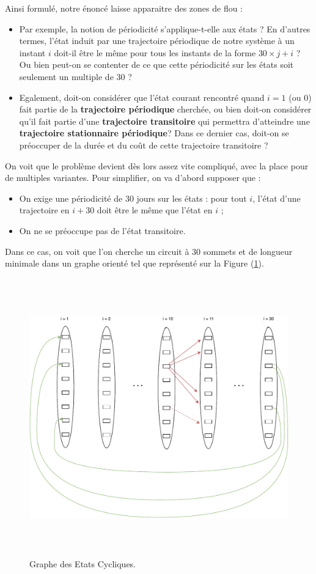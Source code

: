 Ainsi formulé, notre énoncé laisse apparaitre des zones de flou : 
\begin{itemize}[label=$\square$]
	\item	Par exemple, la notion de périodicité s'applique-t-elle aux états ? En d'autres termes, l'état induit par une trajectoire périodique de notre système à un instant $i$ doit-il être le même pour tous les instants de la forme $30 \times j + i$ ? Ou bien peut-on se contenter de ce que cette périodicité sur les états soit seulement un multiple de 30 ? 
	\item	Egalement, doit-on considérer que l'état courant rencontré quand $i = 1$ (ou 0) fait partie de la \textbf{trajectoire périodique} cherchée, ou bien doit-on considérer qu'il fait partie d'une \textbf{trajectoire transitoire} qui permettra d'atteindre une \textbf{trajectoire stationnaire périodique}? Dans ce dernier cas, doit-on se préoccuper de la durée et du coût de cette trajectoire transitoire ?  
\end{itemize}
On voit que le problème devient dès lors assez vite compliqué, avec la place pour de multiples variantes. Pour simplifier, on va d'abord supposer que :
\begin{itemize}[label=$\square$]
	\item	On exige une périodicité de 30 jours sur les états : pour tout $i$, l'état d'une trajectoire en $i+ 30$ doit être le même que l'état en $i$ ;
	\item	On ne se préoccupe pas de l'état transitoire.
\end{itemize}
Dans ce cas, on voit que l'on cherche un circuit à 30 sommets et de longueur minimale dans un graphe orienté tel que représenté sur la Figure (\ref{Etats_Cycliques}).

\begin{figure}[H]
	\centerline{
		\includegraphics[height=12cm]{images_these/Etats_Cycliques.pdf}}
	\caption[Graphe des Etats Cycliques. ]{Graphe des Etats Cycliques.}
	\label{Etats_Cycliques}
\end{figure}


